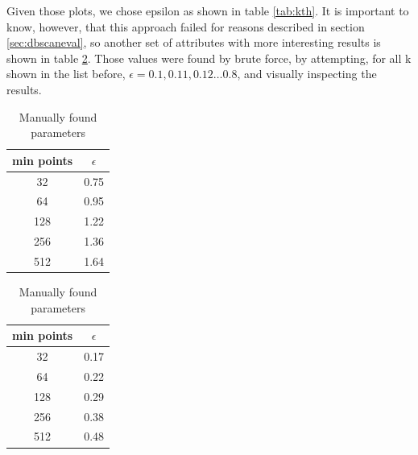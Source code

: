 \documentclass{article}
\begin{document}
	Given those plots, we chose epsilon as shown in table \ref{tab:kth}.
	It is important to know, however, that this approach failed for reasons described in section \ref{sec:dbscaneval}, so another set of attributes with more interesting results is shown in table \ref{tab:dbscan}. Those values were found by brute force, by attempting, for all k shown in the list before, $\epsilon = 0.1, 0.11, 0.12\dots 0.8$, and visually inspecting the results.\\
	
	\begin{table}
		\parbox{.45\linewidth}{
			\centering
			\begin{tabular}{c|c}
				\hline
				min points & $\epsilon$\\
				\hline
				\rowcolor{Gray}
				32 & 0.75 \\
				64 & 0.95 \\
				\rowcolor{Gray}
				128 & 1.22 \\
				256 & 1.36 \\
				\rowcolor{Gray}
				512 & 1.64 \\
				\hline
			\end{tabular}
			\caption{K-th nearest neighbours parameters}
			\label{tab:kth}
		}
		\hfill
		\parbox{.45\linewidth}{
			\centering
			\begin{tabular}{c|c}
				\hline
				min points & $\epsilon$\\
				\hline
				\rowcolor{Gray}
				32 & 0.17 \\
				64 & 0.22 \\
				\rowcolor{Gray}
				128 & 0.29 \\
				256 & 0.38 \\
				\rowcolor{Gray}
				512 & 0.48 \\
				\hline
			\end{tabular}
			\caption{Manually found parameters}
			\label{tab:dbscan}
		}
	\end{table}
	
\end{document}
